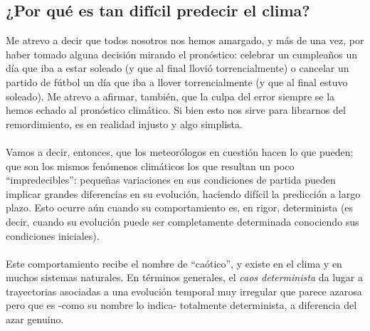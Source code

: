 \documentclass[12pt,a4paper]{article}
\begin{document}
\subsection{¿Por qué es tan difícil predecir el clima?}
Me atrevo a decir que todos nosotros nos hemos amargado, y más de una vez, por haber tomado alguna decisión mirando el pronóstico: celebrar un cumpleaños un día que iba a estar soleado (y que al final llovió torrencialmente) o cancelar un partido de fútbol un día que iba a llover torrencialmente (y que al final estuvo soleado). Me atrevo a afirmar, también, que la culpa del error siempre se la hemos echado al pronóstico climático. Si bien esto nos sirve para librarnos del remordimiento, es en realidad injusto y algo simplista.
\\
\\
Vamos a decir, entonces, que los meteorólogos en cuestión hacen lo que pueden; que son los mismos fenómenos climáticos los que resultan un poco ``impredecibles'': pequeñas variaciones en sus condiciones de partida pueden implicar grandes diferencias en su evolución, haciendo difícil la predicción a largo plazo. Esto ocurre aún cuando su comportamiento es, en rigor, determinista (es decir, cuando su evolución puede ser completamente determinada conociendo sus condiciones iniciales).
\\
\\
Este comportamiento recibe el nombre de ``caótico'', y existe en el clima y en muchos sistemas naturales. En términos generales, el \textit{caos determinista} da lugar a trayectorias asociadas a una evolución temporal muy irregular que parece azarosa pero que es -como su nombre lo indica- totalmente determinista, a diferencia del azar genuino.
\\
\end{document}
